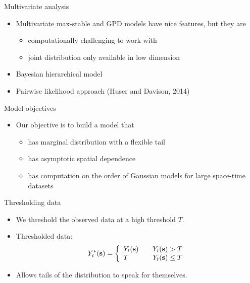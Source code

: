 \documentclass{beamer}
\begin{document}
\begin{frame}{Multivariate analysis}
  \begin{itemize} \setlength{\itemsep}{0.5em}
    \item Multivariate max-stable and GPD models have nice features, but they are
    \begin{itemize}
      \item computationally challenging to work with
      \item joint distribution only available in low dimension
    \end{itemize}
    \item Bayesian hierarchical model
    \item Pairwise likelihood approach (Huser and Davison, 2014)
  \end{itemize}
\end{frame}

\begin{frame}{Model objectives}
  \begin{itemize} \setlength{\itemsep}{0.5em}
    \item Our objective is to build a model that
    \begin{itemize}
      \item has marginal distribution with a flexible tail
      \item has asymptotic spatial dependence
      \item has computation on the order of Gaussian models for large space-time datasets
    \end{itemize}
  \end{itemize}
\end{frame}

\begin{frame}{Thresholding data}
  \begin{itemize} \setlength{\itemsep}{0.5em}
    \item We threshold the observed data at a high threshold $T$.
    \item Thresholded data:
    \begin{align*}
      Y_t^*(\mbox{\bf s}) = \left\{ \begin{array}{ll}
          Y_t(\mbox{\bf s}) \quad & Y_t(\mbox{\bf s}) > T\\
          T \quad & Y_t(\mbox{\bf s}) \le T
      \end{array}\right.
    \end{align*}
    \item Allows tails of the distribution to speak for themselves.
  \end{itemize}
\end{frame}
\end{document}
